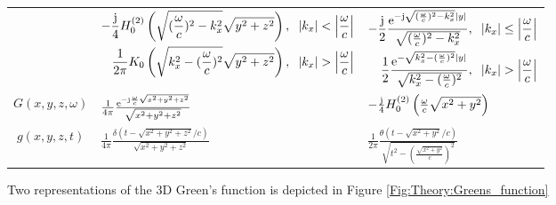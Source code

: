 \begin{table}[h!]
{\begin{tabular}[h!]{ @{}c | | l | l@{} }
    &      
    \scriptsize
    $\begin{aligned}[t] %
	-\frac{\ti}{4} H_0^{(2)}\left( \sqrt{(\frac{\omega}{c})^2 - k_x^2 } \sqrt{y^2+z^2} \right),\hspace{2mm} |k_x|<\left| \frac{\omega}{c} \right| \\ \frac{1}{2\pi} K_0\left( \sqrt{k_x^2 - (\frac{\omega}{c})^2 } \sqrt{y^2+z^2} \right),\hspace{2mm}  |k_x|>\left| \frac{\omega}{c} \right| 
	\end{aligned}$ \normalsize
     &     
     \scriptsize	$\begin{aligned}[t]
	-\frac{\ti}{2}\frac{\te^{-\ti\sqrt{(\frac{\omega}{c})^2 - k_x^2 }|y|}}{\sqrt{(\frac{\omega}{c})^2 - k_x^2 }},\hspace{2mm} |k_x|		\leq			\left| \frac{\omega}{c} \right| \\
	\frac{1}{2}\frac{\te^{- \sqrt{k_x^2 -(\frac{\omega}{c})^2}|y|}}{\sqrt{k_x^2 -(\frac{\omega}{c})^2}},\hspace{2mm}   |k_x|>\left| 					\frac{\omega}{c} \right| 
	\end{aligned}$ \normalsize      \\ 
    $G(x,y,z,\omega)$ 				 &  $\frac{1}{4\pi}\frac{\mathrm{e}^{-\mathrm{j}\frac{\omega}{c}\sqrt{x^2+y^2+z^2}}}{\sqrt{x^2+y^2+z^2}}$ & \scriptsize$-\frac{\mathrm{j}}{4} H_0^{(2)}\left( \frac{\omega}{c} \sqrt{x^2+y^2} \right) $\normalsize  \\ 
    $g(x,y,z,t)$ 					 &  $\frac{1}{4\pi}\frac{\delta\left( t - \sqrt{x^2+y^2+z^2}/c \right)}{\sqrt{x^2+y^2+z^2}}$  & $\frac{1}{2\pi}\frac{\theta(t - \sqrt{x^2+y^2}/c)}{\sqrt{t^2 - \left(\frac{\sqrt{x^2+y^2}}{c}\right)^2}}$
    \end{tabular}}
\end{table}
\FloatBarrier
Two representations of the 3D Green's function is depicted in Figure \ref{Fig:Theory:Greens_function}


